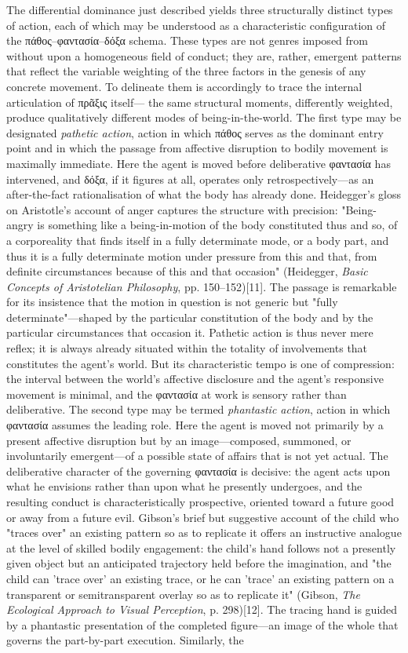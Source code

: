 \documentclass{article}
\begin{document}
The differential dominance just described yields three structurally distinct types of action, each of which may be understood as a characteristic configuration of the πάθος–φαντασία–δόξα schema. These types are not genres imposed from without upon a homogeneous field of conduct; they are, rather, emergent patterns that reflect the variable weighting of the three factors in the genesis of any concrete movement. To delineate them is accordingly to trace the internal articulation of πρᾶξις itself— the same structural moments, differently weighted, produce qualitatively different modes of being-in-the-world. The first type may be designated \textit{pathetic action}, action in which πάθος serves as the dominant entry point and in which the passage from affective disruption to bodily movement is maximally immediate. Here the agent is moved before deliberative φαντασία has intervened, and δόξα, if it figures at all, operates only retrospectively—as an after-the-fact rationalisation of what the body has already done. Heidegger's gloss on Aristotle's account of anger captures the structure with precision: "Being-angry is something like a being-in-motion of the body constituted thus and so, of a corporeality that finds itself in a fully determinate mode, or a body part, and thus it is a fully determinate motion under pressure from this and that, from definite circumstances because of this and that occasion" (Heidegger, \textit{Basic Concepts of Aristotelian Philosophy}, pp. 150–152)[11]. The passage is remarkable for its insistence that the motion in question is not generic but "fully determinate"—shaped by the particular constitution of the body and by the particular circumstances that occasion it. Pathetic action is thus never mere reflex; it is always already situated within the totality of involvements that constitutes the agent's world. But its characteristic tempo is one of compression: the interval between the world's affective disclosure and the agent's responsive movement is minimal, and the φαντασία at work is sensory rather than deliberative. The second type may be termed \textit{phantastic action}, action in which φαντασία assumes the leading role. Here the agent is moved not primarily by a present affective disruption but by an image—composed, summoned, or involuntarily emergent—of a possible state of affairs that is not yet actual. The deliberative character of the governing φαντασία is decisive: the agent acts upon what he envisions rather than upon what he presently undergoes, and the resulting conduct is characteristically prospective, oriented toward a future good or away from a future evil. Gibson's brief but suggestive account of the child who "traces over" an existing pattern so as to replicate it offers an instructive analogue at the level of skilled bodily engagement: the child's hand follows not a presently given object but an anticipated trajectory held before the imagination, and "the child can 'trace over' an existing trace, or he can 'trace' an existing pattern on a transparent or semitransparent overlay so as to replicate it" (Gibson, \textit{The Ecological Approach to Visual Perception}, p. 298)[12]. The tracing hand is guided by a phantastic presentation of the completed figure—an image of the whole that governs the part-by-part execution. Similarly, the 
\end{document}
